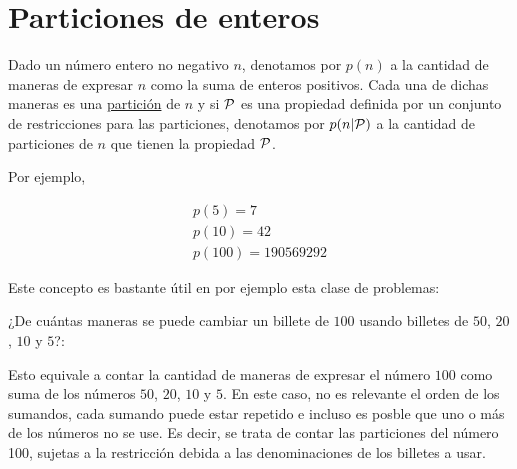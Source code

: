 \section{Particiones de enteros}

\begin{defn}
    Dado un número entero no negativo $n$, denotamos por $p(n)$ a la cantidad de maneras de expresar $n$ como la suma de enteros positivos. Cada una de dichas maneras es una \ul{partición} de $n$ y si $\mathcal{P}$ es una propiedad definida por un conjunto de restricciones para las particiones, denotamos por $p(n|\mathcal{P})$ a la cantidad de particiones de $n$ que tienen la propiedad $\mathcal{P}$.
    
    Por ejemplo,
    
    \begin{gather*}
        p(5) = 7 \\
        p(10) = 42 \\
        p(100) = 190569292
    \end{gather*}
\end{defn}

Este concepto es bastante útil en por ejemplo esta clase de problemas:

\begin{prob}
    ¿De cuántas maneras se puede cambiar un billete de $100$ usando billetes de $50$, $20$, $10$ y $5$?:
    
    Esto equivale a contar la cantidad de maneras de expresar el número $100$ como suma de los números $50$, $20$, $10$ y $5$. En este caso, no es relevante el orden de los sumandos, cada sumando puede estar repetido e incluso es posble que uno o más de los números no se use. Es decir, se trata de contar las particiones del número 100, sujetas a la restricción debida a las denominaciones de los billetes a usar.
\end{prob}

